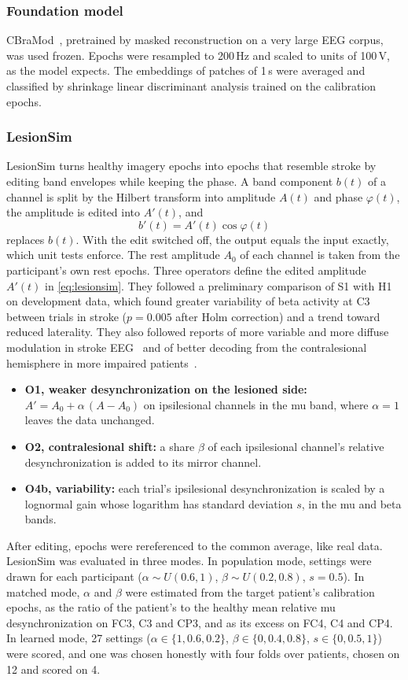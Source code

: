 \documentclass{ieeeaccess}
\begin{document}
\subsubsection{Foundation model} CBraMod~\cite{wang2025cbramod}, pretrained by masked reconstruction on a very large EEG corpus, was used frozen. Epochs were resampled to 200\,Hz and scaled to units of 100\,\textmu V, as the model expects. The embeddings of patches of 1\,s were averaged and classified by shrinkage linear discriminant analysis trained on the calibration epochs.

\subsubsection{LesionSim} LesionSim turns healthy imagery epochs into epochs that resemble stroke by editing band envelopes while keeping the phase. A band component $b(t)$ of a channel is split by the Hilbert transform into amplitude $A(t)$ and phase $\varphi(t)$, the amplitude is edited into $A'(t)$, and
\begin{equation}
b'(t) = A'(t)\cos\varphi(t)\label{eq:lesionsim}
\end{equation}
replaces $b(t)$. With the edit switched off, the output equals the input exactly, which unit tests enforce. The rest amplitude $A_0$ of each channel is taken from the participant's own rest epochs. Three operators define the edited amplitude $A'(t)$ in \eqref{eq:lesionsim}. They followed a preliminary comparison of S1 with H1 on development data, which found greater variability of beta activity at C3 between trials in stroke ($p = 0.005$ after Holm correction) and a trend toward reduced laterality. They also followed reports of more variable and more diffuse modulation in stroke EEG~\cite{via2026} and of better decoding from the contralesional hemisphere in more impaired patients~\cite{mansour2022}.
\begin{itemize}
\item \textbf{O1, weaker desynchronization on the lesioned side:} $A' = A_0 + \alpha\,(A - A_0)$ on ipsilesional channels in the mu band, where $\alpha = 1$ leaves the data unchanged.
\item \textbf{O2, contralesional shift:} a share $\beta$ of each ipsilesional channel's relative desynchronization is added to its mirror channel.
\item \textbf{O4b, variability:} each trial's ipsilesional desynchronization is scaled by a lognormal gain whose logarithm has standard deviation $s$, in the mu and beta bands.
\end{itemize}
After editing, epochs were rereferenced to the common average, like real data. LesionSim was evaluated in three modes. In population mode, settings were drawn for each participant ($\alpha \sim U(0.6, 1)$, $\beta \sim U(0.2, 0.8)$, $s = 0.5$). In matched mode, $\alpha$ and $\beta$ were estimated from the target patient's calibration epochs, as the ratio of the patient's to the healthy mean relative mu desynchronization on FC3, C3 and CP3, and as its excess on FC4, C4 and CP4. In learned mode, 27 settings ($\alpha \in \{1, 0.6, 0.2\}$, $\beta \in \{0, 0.4, 0.8\}$, $s \in \{0, 0.5, 1\}$) were scored, and one was chosen honestly with four folds over patients, chosen on 12 and scored on 4.
\end{document}
